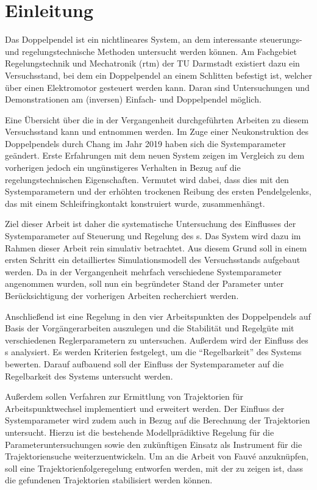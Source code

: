 \chapter{Einleitung}\label{cha:intro}

Das Doppelpendel ist ein nichtlineares System, an dem interessante steuerungs- und regelungstechnische Methoden untersucht werden können. 
Am Fachgebiet Regelungstechnik und Mechatronik (rtm) der TU Darmstadt existiert dazu ein Versuchsstand, bei dem ein Doppelpendel an einem Schlitten befestigt ist, welcher über einen Elektromotor gesteuert werden kann.
Daran sind Untersuchungen und Demonstrationen am (inversen) Einfach- und Doppelpendel möglich. 

Eine Übersicht über die in der Vergangenheit durchgeführten Arbeiten zu diesem Versuchsstand kann \cite{chang} und \cite{ribeiro} entnommen werden. Im Zuge einer Neukonstruktion des Doppelpendels durch Chang \cite{chang} im Jahr 2019 haben sich die Systemparameter geändert. Erste Erfahrungen mit dem neuen System zeigen im Vergleich zu dem vorherigen jedoch ein ungünstigeres Verhalten in Bezug auf die regelungstechnischen Eigenschaften. 
Vermutet wird dabei, dass dies mit den Systemparametern und der erhöhten trockenen Reibung des ersten Pendelgelenks, das mit einem Schleifringkontakt konstruiert wurde, zusammenhängt. 

Ziel dieser Arbeit ist daher die systematische Untersuchung des Einflusses der Systemparameter auf Steuerung und Regelung des \spds s. 
Das System wird dazu im Rahmen dieser Arbeit rein simulativ betrachtet. Aus diesem Grund soll in einem ersten Schritt ein detailliertes Simulationsmodell des Versuchsstands aufgebaut werden. 
Da in der Vergangenheit mehrfach verschiedene Systemparameter angenommen wurden, soll nun ein begründeter Stand der Parameter unter Berücksichtigung der vorherigen Arbeiten recherchiert werden. 

Anschließend ist eine Regelung in den vier Arbeitspunkten des Doppelpendels auf Basis der Vorgängerarbeiten auszulegen und die Stabilität und Regelgüte mit verschiedenen Reglerparametern zu untersuchen. 
Außerdem wird der Einfluss des \beob s analysiert.
Es werden Kriterien festgelegt, um die "`Regelbarkeit"' des Systems bewerten.
Darauf aufbauend soll der Einfluss der Systemparameter auf die Regelbarkeit des Systems untersucht werden. 

Außerdem sollen Verfahren zur Ermittlung von Trajektorien für Arbeitspunktwechsel implementiert und erweitert werden.
Der Einfluss der Systemparameter wird zudem auch in Bezug auf die Berechnung der Trajektorien untersucht. %
Hierzu ist die bestehende Modellprädiktive Regelung für die Parameteruntersuchungen sowie den zukünftigen Einsatz als Instrument für die Trajektoriensuche weiterzuentwickeln. 
Um an die Arbeit von Fauvé \cite{fauve} anzuknüpfen, soll eine Trajektorienfolgeregelung entworfen werden, mit der zu zeigen ist, dass die gefundenen Trajektorien stabilisiert werden können. 

